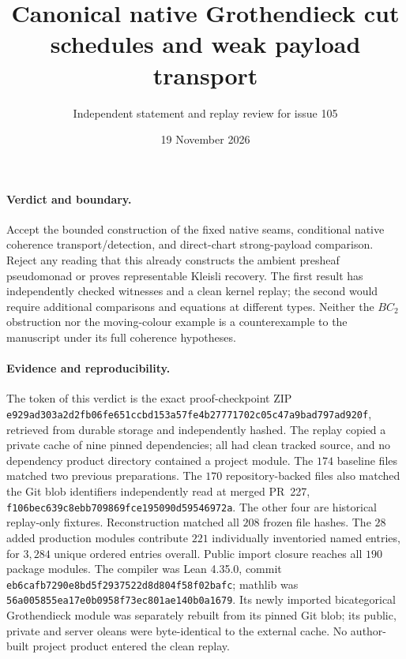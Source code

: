 \documentclass[11pt]{article}
\title{Canonical native Grothendieck cut schedules and weak payload transport}
\author{Independent statement and replay review for issue 105}
\date{19 November 2026}
\begin{document}
\maketitle
\paragraph{Verdict and boundary.}
Accept the bounded construction of the fixed native seams, conditional native
coherence transport/detection, and direct-chart strong-payload comparison.
Reject any reading that this already constructs the ambient presheaf
pseudomonad or proves representable Kleisli recovery. The first result
has independently checked witnesses and a clean kernel replay; the
second would require additional comparisons and equations at different
types. Neither the $BC_2$ obstruction nor the moving-colour example is
a counterexample to the manuscript under its full coherence hypotheses.
\paragraph{Evidence and reproducibility.}
The token of this verdict is the exact proof-checkpoint ZIP
\nolinkurl{e929ad303a2d2fb06fe651ccbd153a57fe4b27771702c05c47a9bad797ad920f},
retrieved from durable storage and independently hashed. The replay copied
a private cache of nine pinned dependencies; all had clean tracked source,
and no dependency product directory contained a project module.
The $174$ baseline files matched two previous preparations. The $170$
repository-backed files also matched the Git blob identifiers independently
read at merged PR~227, \nolinkurl{f106bec639c8ebb709869fce195090d59546972a}.
The other four are historical replay-only fixtures. Reconstruction matched
all $208$ frozen file hashes. The $28$ added production modules contribute
$221$ individually inventoried named entries, for $3{,}284$ unique ordered
entries overall. Public import closure reaches all $190$ package modules.
The compiler was Lean 4.35.0, commit
\nolinkurl{eb6cafb7290e8bd5f2937522d8d804f58f02bafc}; mathlib was
\nolinkurl{56a005855ea17e0b0958f73ec801ae140b0a1679}. Its newly imported
bicategorical Grothendieck module was separately rebuilt from its pinned Git
blob; its public, private and server oleans were byte-identical to the
external cache. No author-built project product entered the clean replay.
\end{document}
